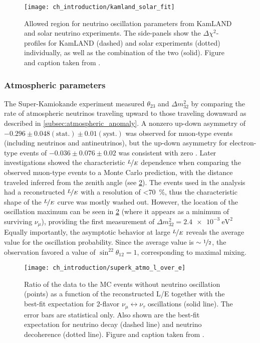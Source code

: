 \begin{figure}
    \centering
    \texttt{[image: ch\_introduction/kamland\_solar\_fit]}
    \caption[Solar oscillation parameters allowed region]{
        Allowed region for neutrino oscillation parameters from KamLAND and solar
        neutrino experiments.
        The side-panels show the $\Delta \chi^2$-profiles
        for KamLAND (dashed) and solar experiments (dotted) individually,
        as well as the combination of the two (solid).
        Figure and caption taken from \cite{kamland_latest}.
    }
    \label{fig:kamland_plus_solar}
\end{figure}

\subsubsection{Atmospheric parameters}
The Super-Kamiokande experiment measured $\theta_{23}$ and $\Delta m^2_{32}$
by comparing the rate of atmospheric neutrinos
traveling upward to those traveling downward
as described in \cref{subsec:atmospheric_anomaly}.
A nonzero up-down asymmetry of $-0.296\pm0.048(\text{stat.})\pm0.01(\text{syst.})$
was observed for muon-type events (including neutrinos and antineutrinos),
but the up-down asymmetry for electron-type events
of $-0.036\pm0.076\pm0.02$ was consistent with zero \cite{superk1998}.
Later investigations \cite{superk2004} showed the characteristic $\nicefrac{L}{E}$
dependence when comparing the observed muon-type events
to a Monte Carlo prediction,
with the distance traveled inferred from the zenith angle
(see \cref{fig:superk_l_over_e}).
The events used in the analysis had a reconstructed $\nicefrac{L}{E}$
with a resolution of \SI{<70}{\percent},
thus the characteristic shape of the $\nicefrac{L}{E}$ curve
was mostly washed out.
However, the location of the oscillation maximum
can be seen in \cref{fig:superk_l_over_e}
(where it appears as a minimum of surviving $\nu_\mu$),
providing the first measurement of $\Delta m^2_{32} = \SI{2.4e-3}{\eV\squared}$
Equally importantly, the asymptotic behavior
at large $\nicefrac{L}{E}$ reveals
the average value for the oscillation probability.
Since the average value is $\sim\nicefrac{1}{2}$,
the observation favored a value of $\sin^22\theta_{12} = 1$,
corresponding to maximal mixing.

\begin{figure}
    \centering
    \texttt{[image: ch\_introduction/superk\_atmo\_l\_over\_e]}
    \caption[Super-Kamiokande atmospheric L/E distribution]{
        Ratio of the data to the MC events without neutrino oscillation (points)
        as a function of the reconstructed L/E together with
        the best-fit expectation for 2-flavor $\nu_\mu\leftrightarrow\nu_\tau$
        oscillations (solid line).
        The error bars are statistical only.
        Also shown are the best-fit expectation for neutrino decay (dashed line)
        and neutrino decoherence (dotted line).
        Figure and caption taken from \cite{superk2004}.
    }
    \label{fig:superk_l_over_e}
\end{figure}

